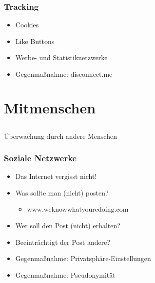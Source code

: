 \documentclass[12pt]{beamer}
\begin{document}
\begin{frame}
    \frametitle{Tracking}
    \begin{itemize}
        \item<2-> Cookies
        \item<3-> Like Buttons
        \item<4-> Werbe- und Statistiknetzwerke
        \item<5-> Gegenmaßnahme: disconnect.me
    \end{itemize}
\end{frame}

\section{Mitmenschen}
\subsection{}

\begin{frame}
  \begin{center}\Large
    Überwachung durch andere Menschen
  \end{center}
\end{frame}

\begin{frame}
    \frametitle{Soziale Netzwerke}
    \begin{itemize}
        \item<2-> Das Internet vergisst nicht!
        \item<3-> Was sollte man (nicht) posten?
            \begin{itemize}
                \item<4-> www.weknowwhatyouredoing.com
            \end{itemize}
        \item<5-> Wer soll den Post (nicht) erhalten?
        \item<6-> Beeinträchtigt der Post andere?
        \item<7-> Gegenmaßnahme: Privatsphäre-Einstellungen
        \item<8-> Gegenmaßnahme: Pseudonymität
    \end{itemize}
\end{frame}
\end{document}
